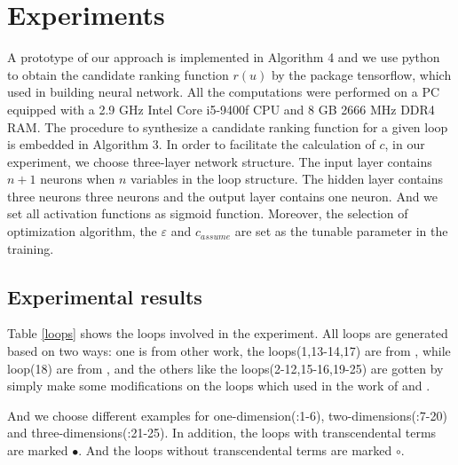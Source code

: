 \section{Experiments}
\label{Experiments}
A prototype of our approach is implemented in Algorithm 4 and we use python to obtain the candidate ranking function $r(u)$ by the package tensorflow\cite{tensorflow2015-whitepaper}, which used in building neural network. All the computations were performed on a PC equipped with a 2.9 GHz Intel Core i5-9400f CPU and 8 GB 2666 MHz DDR4 RAM.
The procedure to synthesize a candidate ranking function for a given loop is embedded in Algorithm 3. In order to facilitate the calculation of $c$, in our experiment, we choose three-layer network structure. The input layer contains $n+1$ neurons when $n$ variables in the loop structure. The hidden layer contains three neurons three neurons and the output layer contains  one neuron. And we set all activation functions as sigmoid function. Moreover, the selection of optimization algorithm, the $\varepsilon $ and ${c_{assume}}$ are set as the tunable parameter in the training.

\subsection{Experimental results}
\label{Experimental results}
Table \ref{loops} shows the loops involved in the experiment. All loops are generated based on two ways: one is from other work, the loops(1,13-14,17) are from \cite{yuan2019ranking}, while loop(18) are from \cite{ben2017multiphase}, and the others like the loops(2-12,15-16,19-25) are gotten by simply make some modifications on the loops which used in the work of \cite{yuan2019ranking} and \cite{ben2017multiphase}. 

And we choose different examples for one-dimension(:1-6), two-dimensions(:7-20) and three-dimensions(:21-25). In addition, the loops with transcendental terms are marked $\bullet$. And the loops without transcendental terms are marked $\circ$. 

